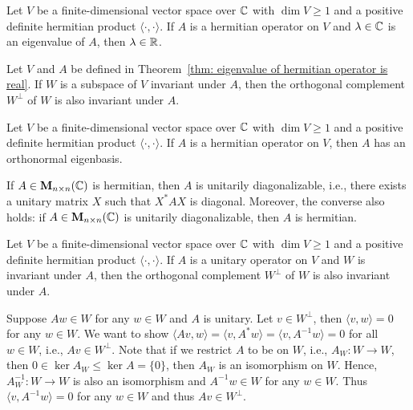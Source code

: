     \begin{theoremenv}\label{thm: eigenvalue of hermitian operator is real}
        Let $V$ be a finite-dimensional vector space over $\mathbb{C}$ with $\dim V\ge 1$ and a positive definite hermitian product $\langle \cdot, \cdot \rangle$. If $A$ is a hermitian operator on $V$ and $\lambda \in \mathbb{C}$ is an eigenvalue of $A$, then $\lambda \in \mathbb{R}$.
    \end{theoremenv}
    \begin{lemmaenv}
        Let $V$ and $A$ be defined in Theorem~\ref{thm: eigenvalue of hermitian operator is real}. If $W$ is a subspace of $V$ invariant under $A$, then the orthogonal complement $W^\perp$ of $W$ is also invariant under $A$.
    \end{lemmaenv}
    \begin{theoremenv}
        Let $V$ be a finite-dimensional vector space over $\mathbb{C}$ with $\dim V\ge 1$ and a positive definite hermitian product $\langle \cdot, \cdot \rangle$. If $A$ is a hermitian operator on $V$, then $A$ has an orthonormal eigenbasis.
    \end{theoremenv}
    \begin{remarkenv}
        If $A\in \mathbf{M}_{n\times n}(\mathbb{C})$ is hermitian, then $A$ is unitarily diagonalizable, i.e., there exists a unitary matrix $X$ such that $X^* A X$ is diagonal. Moreover, the converse also holds: if $A\in \mathbf{M}_{n\times n}(\mathbb{C})$ is unitarily diagonalizable, then $A$ is hermitian.
    \end{remarkenv}
    \begin{lemmaenv}
        Let $V$ be a finite-dimensional vector space over $\mathbb{C}$ with $\dim V\ge 1$ and a positive definite hermitian product $\langle \cdot, \cdot \rangle$. If $A$ is a unitary operator on $V$ and $W$ is invariant under $A$, then the orthogonal complement $W^\perp$ of $W$ is also invariant under $A$.
    \end{lemmaenv}
    \begin{proofenv}
        Suppose $Aw \in W$ for any $w\in W$ and $A$ is unitary. Let $v\in W^\perp$, then $\langle v,w \rangle = 0$ for any $w\in W$. We want to show $\langle Av,w \rangle = \langle v, A^* w \rangle = \langle v, A^{-1} w \rangle = 0$ for all $w\in W$, i.e., $Av \in W^\perp$. Note that if we restrict $A$ to be on $W$, i.e., $A_W:W\to W$, then $0\in \ker A_W \le \ker A = \{ 0\}$, then $A_W$ is an isomorphism on $W$. Hence, $A_W^{-1}: W\to W$ is also an isomorphism and $A^{-1} w \in W$ for any $w\in W$. Thus $\langle v, A^{-1} w \rangle = 0$ for any $w\in W$ and thus $Av \in W^\perp$.
    \end{proofenv}
